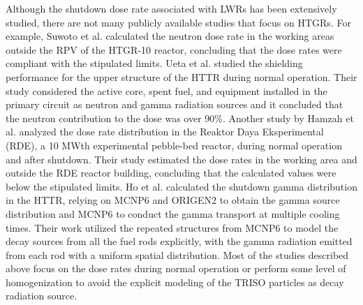 Although the shutdown dose rate associated with LWRs has been extensively studied, there are not many publicly available studies that focus on \glspl*{HTGR}.
%
For example, Suwoto et al. \cite{suwoto_neutron_2018} calculated the neutron dose rate in the working areas outside the \gls*{RPV} of the HTGR-10 reactor, concluding that the dose rates were compliant with the stipulated limits.
% 
Ueta et al. \cite{ueta_shielding_2016} studied the shielding performance for the upper structure of the \gls*{HTTR} during normal operation.
Their study considered the active core, spent fuel, and equipment installed in the primary circuit as neutron and gamma radiation sources and it concluded that the neutron contribution to the dose was over 90\%.
% 
Another study by Hamzah et al. \cite{hamzah_preliminary_2019} analyzed the dose rate distribution in the Reaktor Daya Eksperimental (RDE), a 10 MWth experimental pebble-bed reactor, during normal operation and after shutdown.
Their study estimated the dose rates in the working area and outside the RDE reactor building, concluding that the calculated values were below the stipulated limits.
%
Ho et al. \cite{ho_calculation_2022} calculated the shutdown gamma distribution in the \gls*{HTTR}, relying on MCNP6 \cite{mcnp} and ORIGEN2 \cite{croff_origen2_1980} to obtain the gamma source distribution and MCNP6 to conduct the gamma transport at multiple cooling times.
Their work utilized the repeated structures from MCNP6 to model the decay sources from all the fuel rods explicitly, with the gamma radiation emitted from each rod with a uniform spatial distribution.
Most of the studies described above focus on the dose rates during normal operation or perform some level of homogenization to avoid the explicit modeling of the TRISO particles as decay radiation source.


